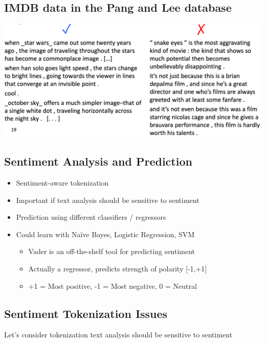 \documentclass[11pt]{article}
\theoremstyle{definition}
\begin{document}
\subsection{IMDB data in the Pang and Lee database}
\includegraphics[width=\textwidth]{12.png}

\subsection{Sentiment Analysis and Prediction}
\begin{itemize}
  \item Sentiment-aware tokenization
  \item Important if text analysis should be sensitive to sentiment
\end{itemize}
\begin{itemize}
  \item Prediction using different classifiers / regressors
  \item Could learn with Naïve Bayes, Logistic Regression, SVM
  \begin{itemize}
    \item Vader is an off-the-shelf tool for predicting sentiment
    \item Actually a regressor, predicts strength of polarity [-1,+1]
    \item +1 = Most positive, -1 = Most negative, 0 = Neutral
  \end{itemize}
\end{itemize}

\subsection{Sentiment Tokenization Issues}
Let’s consider tokenization
text analysis should be
sensitive to sentiment
\end{document}
